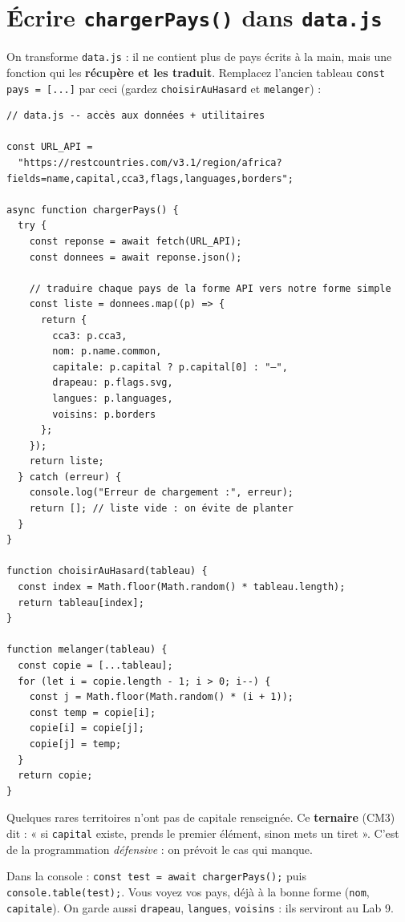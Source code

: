 \documentclass[11pt,a4paper]{article}
\newcommand{\code}[1]{\texttt{#1}}
\begin{document}
\section{Écrire \texttt{chargerPays()} dans \texttt{data.js}}

On transforme \code{data.js} : il ne contient plus de pays écrits à la main, mais une fonction qui les \textbf{récupère et les traduit}. Remplacez l'ancien tableau \code{const pays = [...]} par ceci (gardez \code{choisirAuHasard} et \code{melanger}) :

\begin{lstlisting}[style=js]
// data.js -- accès aux données + utilitaires

const URL_API =
  "https://restcountries.com/v3.1/region/africa?fields=name,capital,cca3,flags,languages,borders";

async function chargerPays() {
  try {
    const reponse = await fetch(URL_API);
    const donnees = await reponse.json();

    // traduire chaque pays de la forme API vers notre forme simple
    const liste = donnees.map((p) => {
      return {
        cca3: p.cca3,
        nom: p.name.common,
        capitale: p.capital ? p.capital[0] : "—",
        drapeau: p.flags.svg,
        langues: p.languages,
        voisins: p.borders
      };
    });
    return liste;
  } catch (erreur) {
    console.log("Erreur de chargement :", erreur);
    return []; // liste vide : on évite de planter
  }
}

function choisirAuHasard(tableau) {
  const index = Math.floor(Math.random() * tableau.length);
  return tableau[index];
}

function melanger(tableau) {
  const copie = [...tableau];
  for (let i = copie.length - 1; i > 0; i--) {
    const j = Math.floor(Math.random() * (i + 1));
    const temp = copie[i];
    copie[i] = copie[j];
    copie[j] = temp;
  }
  return copie;
}
\end{lstlisting}

\begin{infobox}
Quelques rares territoires n'ont pas de capitale renseignée. Ce \textbf{ternaire} (CM3) dit : « si \code{capital} existe, prends le premier élément, sinon mets un tiret ». C'est de la programmation \emph{défensive} : on prévoit le cas qui manque.
\end{infobox}

\begin{infobox}
Dans la console : \code{const test = await chargerPays();} puis \code{console.table(test);}. Vous voyez vos pays, déjà à la bonne forme (\code{nom}, \code{capitale}). On garde aussi \code{drapeau}, \code{langues}, \code{voisins} : ils serviront au Lab 9.
\end{infobox}
\end{document}
